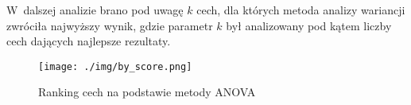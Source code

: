 W~dalszej analizie brano pod uwagę $k$ cech, dla których metoda analizy wariancji zwróciła najwyższy wynik, gdzie parametr $k$ był analizowany pod kątem liczby cech dających najlepsze rezultaty.


\begin{figure}[h]
    \texttt{[image: ./img/by\_score.png]}
    \caption{Ranking cech na podstawie metody ANOVA} \label{fig:by_score}
\end{figure}

